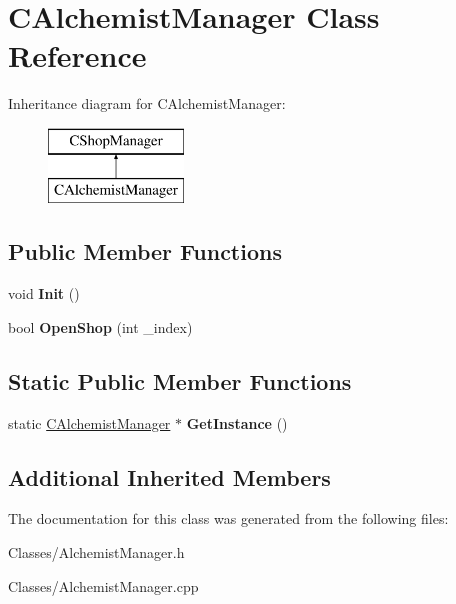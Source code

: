 \hypertarget{class_c_alchemist_manager}{}\section{C\+Alchemist\+Manager Class Reference}
\label{class_c_alchemist_manager}
Inheritance diagram for C\+Alchemist\+Manager\+:\begin{figure}[H]
\begin{center}
\leavevmode
\includegraphics[height=2.000000cm]{class_c_alchemist_manager}
\end{center}
\end{figure}
\subsection*{Public Member Functions}
\begin{DoxyCompactItemize}
\item 
void {\bfseries Init} ()\hypertarget{class_c_alchemist_manager_ac16ed82c1b2b41f1053e3aa37107a07a}{}\label{class_c_alchemist_manager_ac16ed82c1b2b41f1053e3aa37107a07a}

\item 
bool {\bfseries Open\+Shop} (int \+\_\+index)\hypertarget{class_c_alchemist_manager_a2ba1d0c6e97d65e1834b9fafb8f6803c}{}\label{class_c_alchemist_manager_a2ba1d0c6e97d65e1834b9fafb8f6803c}

\end{DoxyCompactItemize}
\subsection*{Static Public Member Functions}
\begin{DoxyCompactItemize}
\item 
static \hyperlink{class_c_alchemist_manager}{C\+Alchemist\+Manager} $\ast$ {\bfseries Get\+Instance} ()\hypertarget{class_c_alchemist_manager_ac5317783685c1469cf8568658330a524}{}\label{class_c_alchemist_manager_ac5317783685c1469cf8568658330a524}

\end{DoxyCompactItemize}
\subsection*{Additional Inherited Members}


The documentation for this class was generated from the following files\+:\begin{DoxyCompactItemize}
\item 
Classes/Alchemist\+Manager.\+h\item 
Classes/Alchemist\+Manager.\+cpp\end{DoxyCompactItemize}
